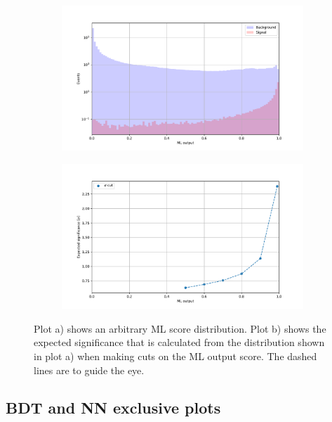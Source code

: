 \documentclass[12pt, a4paper]{book}
\begin{document}
\begin{figure}[!ht]
	\centering
    \begin{subfigure}[b]{0.65\textwidth}
        \centering
        \includegraphics[width=\textwidth]{VAL.pdf}
    \end{subfigure}
    \hfill
    \begin{subfigure}[b]{0.65\textwidth}
        \centering
        \includegraphics[width=\textwidth]{EXP_SIG.pdf}
    \end{subfigure}
    \caption[Significance plot illustration]{Plot a) shows an arbitrary ML score distribution. Plot b) shows the expected significance that is calculated from the distribution shown in plot a) when making cuts on the ML output score. The dashed lines are to guide the eye.}\label{fig:EXP_SIG}
\end{figure}

\subsection{BDT and NN exclusive plots}\label{sec:feat}
\end{document}
